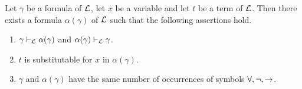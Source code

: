 \documentclass[10pt]{amsart}
\begin{document}
\begin{lemma}\label{lemma:alphabetic_variants}
	Let $\gamma$ be a formula of ${\mathcal L}$, let $x$ be a variable and let $t$ be a term of ${\mathcal L}$. Then there exists a formula $\alpha(\gamma)$ of ${\mathcal L}$ such that the following assertions hold.
	\begin{enumerate}[label=\emph{\textbf{(\arabic*)}}, leftmargin=3.0em]
		\item $\gamma \vdash_{{\mathcal L}} \alpha(\gamma)$ and $\alpha(\gamma) \vdash_{{\mathcal L}} \gamma$.
		\item $t$ is substitutable for $x$ in $\alpha(\gamma)$.
		\item $\gamma$ and $\alpha(\gamma)$ have the same number of occurrences of symbols $\forall , \neg, \rightarrow$.
	\end{enumerate}
\end{lemma}
\end{document}

